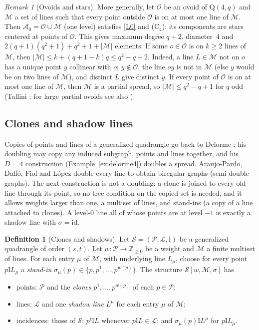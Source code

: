 \documentclass[11pt]{amsart}
\theoremstyle{definition}
\newtheorem{definition}[theorem]{Definition}
\theoremstyle{remark}
\newtheorem{remark}[theorem]{Remark}
\newcommand{\cS}{\mathcal{S}}
\newcommand{\cP}{\mathcal{P}}
\newcommand{\cL}{\mathcal{L}}
\newcommand{\cA}{\mathcal{A}}
\newcommand{\cO}{\mathcal{O}}
\newcommand{\cM}{\mathcal{M}}
\newcommand{\I}{\mathrel{\mathrm{I}}}
\newcommand{\Qf}{\mathrm{Q}}
\begin{document}
\begin{remark}[Ovoids and stars]\label{rem:ovoidfamily}
More generally, let $\cO$ be an ovoid of $\Qf(4,q)$ and $\cM$ a set of lines such that every point outside $\cO$ is on at most one line of $\cM$. Then $\cA_0=\cO\cup\cM$ (one level) satisfies \ref{L0} and \textup{(C$_4$)}: its components are stars centered at points of $\cO$. This gives maximum degree $q+2$, diameter~$4$ and $2(q+1)(q^2+1)+q^2+1+|\cM|$ elements. If some $o\in\cO$ is on $k\ge2$ lines of $\cM$, then $|\cM|\le k+(q+1-k)q\le q^2-q+2$. Indeed, a line $L\in\cM$ not on $o$ has a unique point $y$ collinear with $o$; $y\notin\cO$, the line $oy$ is not in $\cM$ (else $y$ would be on two lines of $\cM$), and distinct $L$ give distinct $y$. If every point of $\cO$ is on at most one line of $\cM$, then $\cM$ is a partial spread, so $|\cM|\le q^2-q+1$ for $q$ odd (Tallini \cite{Tal91}; for large partial ovoids see also \cite{CDPS22}).
\end{remark}

\subsection{Clones and shadow lines}
Copies of points and lines of a generalized quadrangle go back to Delorme \cite[\S\S7--8]{D85a}: his doubling may copy any induced subgraph, points and lines together, and his $D=4$ construction (Example~\ref{ex:delorme4}) doubles a spread. Araujo-Pardo, Dalf\'o, Fiol and L\'opez \cite[Sec.~4]{ADFL21} double every line to obtain biregular graphs (semi-double graphs). The next construction is not a doubling: a clone is joined to every old line through its point, so no tree condition on the copied set is needed, and it allows weights larger than one, a multiset of lines, and stand-ins (a copy of a line attached to clones). A level-$0$ line all of whose points are at level $-1$ is exactly a shadow line with $\sigma=\mathrm{id}$.

\begin{definition}[Clones and shadows]\label{def:clones}
Let $\cS=(\cP,\cL,\I)$ be a generalized quadrangle of order $(s,t)$. Let $w\colon\cP\to\mathbb Z_{\ge0}$ be a weight and $\cM$ a finite multiset of lines. For each entry $\mu$ of $\cM$, with underlying line $L_\mu$, choose for every point $p\I L_\mu$ a \emph{stand-in} $\sigma_\mu(p)\in\{p,p^1,\dots,p^{w(p)}\}$. The structure $\cS[w,\cM,\sigma]$ has
\begin{itemize}[leftmargin=1.5em]
\item points: $\cP$ and the \emph{clones} $p^1,\dots,p^{w(p)}$ of each $p\in\cP$;
\item lines: $\cL$ and one \emph{shadow line} $L^\mu$ for each entry $\mu$ of $\cM$;
\item incidences: those of $\cS$; $p^i\I L$ whenever $p\I L\in\cL$; and $\sigma_\mu(p)\I L^\mu$ for $p\I L_\mu$.
\end{itemize}
\end{definition}
\end{document}
